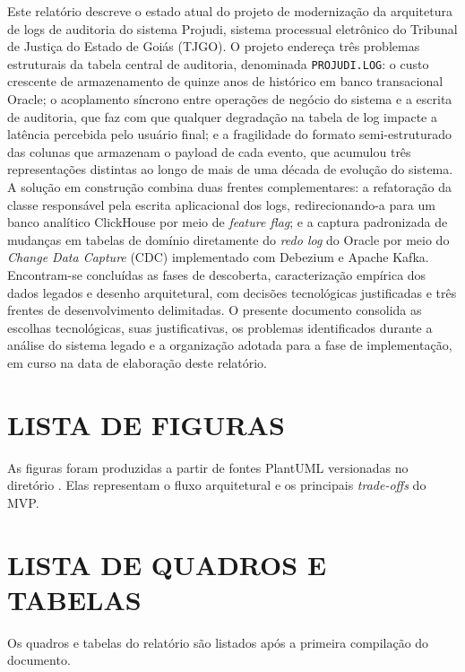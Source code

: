 \documentclass[12pt,letterpaper,oneside]{report}
\begin{document}
Este relatório descreve o estado atual do projeto de modernização da arquitetura de logs de auditoria do sistema Projudi, sistema processual eletrônico do Tribunal de Justiça do Estado de Goiás (TJGO). O projeto endereça três problemas estruturais da tabela central de auditoria, denominada \texttt{PROJUDI.LOG}: o custo crescente de armazenamento de quinze anos de histórico em banco transacional Oracle; o acoplamento síncrono entre operações de negócio do sistema e a escrita de auditoria, que faz com que qualquer degradação na tabela de log impacte a latência percebida pelo usuário final; e a fragilidade do formato semi-estruturado das colunas que armazenam o payload de cada evento, que acumulou três representações distintas ao longo de mais de uma década de evolução do sistema. A solução em construção combina duas frentes complementares: a refatoração da classe responsável pela escrita aplicacional dos logs, redirecionando-a para um banco analítico ClickHouse por meio de \textit{feature flag}; e a captura padronizada de mudanças em tabelas de domínio diretamente do \textit{redo log} do Oracle por meio do \textit{Change Data Capture} (CDC) implementado com Debezium e Apache Kafka. Encontram-se concluídas as fases de descoberta, caracterização empírica dos dados legados e desenho arquitetural, com decisões tecnológicas justificadas e três frentes de desenvolvimento delimitadas. O presente documento consolida as escolhas tecnológicas, suas justificativas, os problemas identificados durante a análise do sistema legado e a organização adotada para a fase de implementação, em curso na data de elaboração deste relatório.

\clearpage

\chapter*{LISTA DE FIGURAS}
As figuras foram produzidas a partir de fontes PlantUML versionadas no diretório
\texttt{}. Elas representam o fluxo arquitetural e os principais
\textit{trade-offs} do MVP.


\clearpage

\chapter*{LISTA DE QUADROS E TABELAS}
Os quadros e tabelas do relatório são listados após a primeira compilação do
documento.
\end{document}
